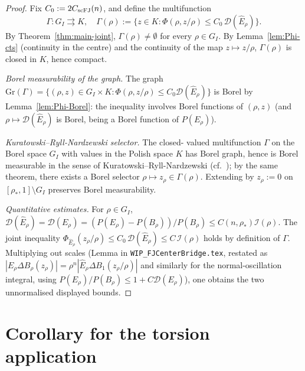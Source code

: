 \documentclass[11pt]{article}
\theoremstyle{definition}
\newcommand{\rstar}{\rho_{*}}
\newcommand{\dD}{\mathcal D}
\newcommand{\scFJ}{{\rm scFJ}}
\begin{document}
\begin{proof}
Fix \(C_0:=2C_{\scFJ}(n)\), and define the multifunction
\[
   \Gamma:G_I\rightrightarrows K,\quad
   \Gamma(\rho):=\bigl\{z\in K:
   \Phi(\rho,z/\rho)\le C_0\,\dD(\hat E_\rho)\bigr\}.
\]
By Theorem~\ref{thm:main-joint}, \(\Gamma(\rho)\ne\emptyset\) for
every \(\rho\in G_I\).  By Lemma~\ref{lem:Phi-cts} (continuity in the
centre) and the continuity of the map \(z\mapsto z/\rho\),
\(\Gamma(\rho)\) is closed in \(K\), hence compact.

\smallskip\emph{Borel measurability of the graph.}  The graph
\(\mathrm{Gr}(\Gamma)=\{(\rho,z)\in G_I\times K:\Phi(\rho,z/\rho)\le
C_0\dD(\hat E_\rho)\}\) is Borel by Lemma~\ref{lem:Phi-Borel}: the
inequality involves Borel functions of \((\rho,z)\) (and \(\rho\mapsto
\dD(\hat E_\rho)\) is Borel, being a Borel function of
\(P(E_\rho)\)).

\smallskip\emph{Kuratowski--Ryll-Nardzewski selector.}  The closed-
valued multifunction \(\Gamma\) on the Borel space \(G_I\) with
values in the Polish space \(K\) has Borel graph, hence is Borel
measurable in the sense of Kuratowski--Ryll-Nardzewski (cf.\
\cite[Theorem~III.6 and Theorem~III.30]{CastaingValadier1977}); by
the same theorem, there exists a Borel selector
\(\rho\mapsto z_\rho\in\Gamma(\rho)\).  Extending by \(z_\rho:=0\) on
\([\rstar,1]\setminus G_I\) preserves Borel measurability.

\smallskip\emph{Quantitative estimates.}  For \(\rho\in G_I\),
\(\dD(\hat E_\rho)=\dD(E_\rho)=(P(E_\rho)-P(B_\rho))/P(B_\rho)\le
C(n,\rstar)\mathcal I(\rho)\).  The joint inequality
\(\Phi_{\hat E_\rho}(z_\rho/\rho)\le C_0\,\dD(\hat E_\rho)
\le C\,\mathcal I(\rho)\) holds by definition of \(\Gamma\).
Multiplying out scales (Lemma in
\texttt{WIP\_FJCenterBridge.tex}, restated as
\(|E_\rho\Delta B_\rho(z_\rho)|=\rho^{n}|\hat E_\rho\Delta B_1(z_\rho/\rho)|\)
and similarly for the normal-oscillation integral, using
\(P(E_\rho)/P(B_\rho)\le 1+C\dD(E_\rho)\)), one obtains the two
unnormalised displayed bounds.
\end{proof}

\section{Corollary for the torsion application}\label{sec:torsion}
\end{document}
